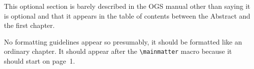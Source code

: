 \documentclass[12pt]{ucsddissertation}
\begin{document}
\begin{dissertationintroduction}
This optional section is barely described in the OGS manual other than
saying it is optional and that it appears in the table of contents
between the Abstract and the first chapter.

No formatting guidelines appear so presumably, it should be formatted
like an ordinary chapter. It should appear after the
\verb!\mainmatter! macro because it should start on page~1.
\end{dissertationintroduction}







\appendix






\backmatter

\end{document}
